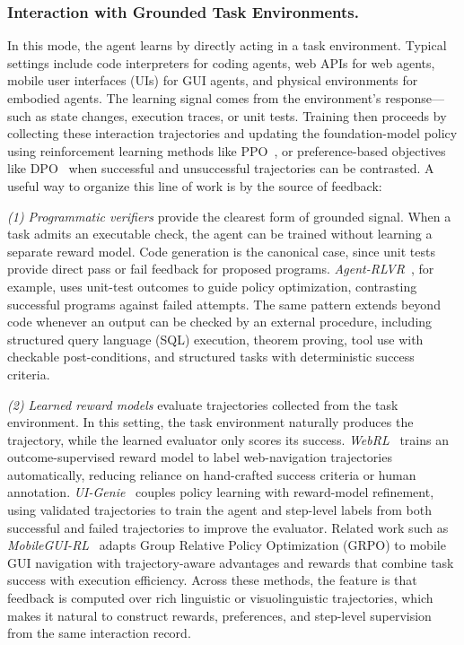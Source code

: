 \documentclass{article}
\begin{document}
\subsubsection{Interaction with Grounded Task Environments.}
\label{sec:Grounded_Interaction_with_Verifiable_Environments}
\label{sec:Environment_Interactive}

In this mode, the agent learns by directly acting in a task environment. Typical settings include code interpreters for coding agents, web APIs for web agents, mobile user interfaces (UIs) for GUI agents, and physical environments for embodied agents. The learning signal comes from the environment's response—such as state changes, execution traces, or unit tests. Training then proceeds by collecting these interaction trajectories and updating the foundation-model policy using reinforcement learning methods like PPO~\citep{schulman2017proximal}, or preference-based objectives like DPO~\citep{rafailov2023direct} when successful and unsuccessful trajectories can be contrasted. A useful way to organize this line of work is by the source of feedback:



\textit{(1) Programmatic verifiers} provide the clearest form of grounded signal. When a task admits an executable check, the agent can be trained without learning a separate reward model. Code generation is the canonical case, since unit tests provide direct pass or fail feedback for proposed programs. \textit{Agent-RLVR}~\citep{da2025agent}, for example, uses unit-test outcomes to  guide policy optimization, contrasting successful programs against failed attempts. The same pattern extends beyond code whenever an output can be checked by an external procedure, including structured query language (SQL) execution, theorem proving, tool use with checkable post-conditions, and structured tasks with deterministic success criteria.


\textit{(2) Learned reward models} evaluate trajectories collected from the task environment. In this setting, the task environment naturally produces the trajectory, while the learned evaluator only scores its success. \textit{WebRL}~\citep{qi2025webrl} trains an outcome-supervised reward model to label web-navigation trajectories automatically, reducing reliance on hand-crafted success criteria or human annotation. \textit{UI-Genie}~\citep{xiao2025uigenie} couples policy learning with reward-model refinement, using validated trajectories to train the agent and step-level labels from both successful and failed trajectories to improve the evaluator. Related work such as \textit{MobileGUI-RL}~\citep{shi2025mobilegui} adapts Group Relative Policy Optimization (GRPO) to mobile GUI navigation with trajectory-aware advantages and rewards that combine task success with execution efficiency. Across these methods, the feature is that feedback is computed over rich linguistic or visuolinguistic trajectories, which makes it natural to construct rewards, preferences, and step-level supervision from the same interaction record.
\end{document}
